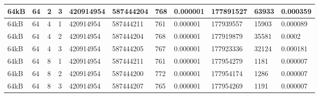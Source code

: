 \documentclass[conference]{IEEEtran}
\begin{document}
\begin{table}
\begin{tabular}{|m{.75cm} |m{.75cm} |m{.8cm} | m{.75cm} | l | l | l | l | l | l | l |}
64kB&64&2&3&420914954&587444204&768&0.000001&177891527&63933&0.000359\\ \hline
64kB&64&4&1&420914954&587444211&761&0.000001&177939557&15903&0.000089\\ \hline
64kB&64&4&2&420914954&587444204&768&0.000001&177919879&35581&0.0002\\ \hline
64kB&64&4&3&420914954&587444205&767&0.000001&177923336&32124&0.000181\\ \hline
64kB&64&8&1&420914954&587444211&761&0.000001&177954279&1181&0.000007\\ \hline
64kB&64&8&2&420914954&587444200&772&0.000001&177954174&1286&0.000007\\ \hline
64kB&64&8&3&420914954&587444207&765&0.000001&177954269&1191&0.000007\\ \hline
  \end{tabular}
\end{table}
\end{document}

